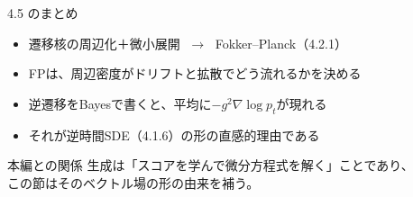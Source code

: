 \asmain
\begin{frame}{4.5 のまとめ}
    \begin{itemize}
        \item 遷移核の周辺化＋微小展開 $\;\to\;$ Fokker--Planck（4.2.1）
        \item FPは、周辺密度がドリフトと拡散でどう流れるかを決める
        \item 逆遷移をBayesで書くと、平均に$-g^{2}\nabla\log p_t$が現れる
        \item それが逆時間SDE（4.1.6）の形の直感的理由である
    \end{itemize}
    \begin{block}{本編との関係}
        生成は「スコアを学んで微分方程式を解く」ことであり、\\
        この節はそのベクトル場の形の由来を補う。
    \end{block}
\end{frame}
